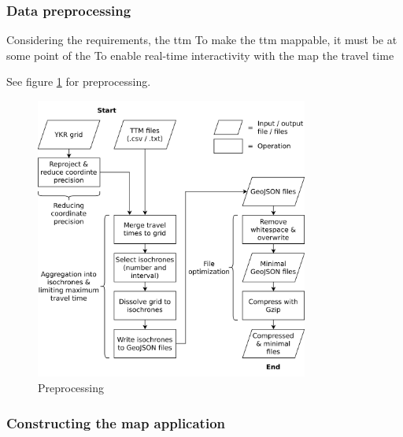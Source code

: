 


\subsubsection{Data preprocessing}
Considering the requirements, the \acrshort{ttm}
To make the \acrshort{ttm} mappable, it must be at some point of the
To enable real-time interactivity with the map the travel time





See figure \ref{fig:preprocessing} for preprocessing.

\begin{figure}[H]
	\centering
	\includegraphics[width=0.8\textwidth]{visual/figures/diagrams/preprocessing.png}
	\caption{Preprocessing}
	\label{fig:preprocessing}
\end{figure}


\subsubsection{Constructing the map application}

